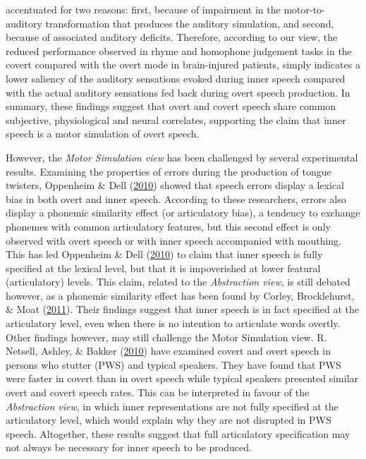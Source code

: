 \documentclass[a4paper,12pt,twoside,openright,oldfontcommands]{memoir}
\begin{document}
accentuated for two reasons: first, because of impairment in the
motor-to-auditory transformation that produces the auditory simulation,
and second, because of associated auditory deficits. Therefore,
according to our view, the reduced performance observed in rhyme and
homophone judgement tasks in the covert compared with the overt mode in
brain-injured patients, simply indicates a lower saliency of the
auditory sensations evoked during inner speech compared with the actual
auditory sensations fed back during overt speech production. In summary,
these findings suggest that overt and covert speech share common
subjective, physiological and neural correlates, supporting the claim
that inner speech is a motor simulation of overt speech.

However, the \emph{Motor Simulation view} has been challenged by several
experimental results. Examining the properties of errors during the
production of tongue twisters, Oppenheim \& Dell
(\protect\hyperlink{ref-oppenheim_motor_2010}{2010}) showed that speech
errors display a lexical bias in both overt and inner speech. According
to these researchers, errors also display a phonemic similarity effect
(or articulatory bias), a tendency to exchange phonemes with common
articulatory features, but this second effect is only observed with
overt speech or with inner speech accompanied with mouthing. This has
led Oppenheim \& Dell
(\protect\hyperlink{ref-oppenheim_motor_2010}{2010}) to claim that inner
speech is fully specified at the lexical level, but that it is
impoverished at lower featural (articulatory) levels. This claim,
related to the \emph{Abstraction view}, is still debated however, as a
phonemic similarity effect has been found by Corley, Brocklehurst, \&
Moat (\protect\hyperlink{ref-corley_error_2011}{2011}). Their findings
suggest that inner speech is in fact specified at the articulatory
level, even when there is no intention to articulate words overtly.
Other findings however, may still challenge the Motor Simulation view.
R. Netsell, Ashley, \& Bakker
(\protect\hyperlink{ref-netsell_inner_2010}{2010}) have examined covert
and overt speech in persons who stutter (PWS) and typical speakers. They
have found that PWS were faster in covert than in overt speech while
typical speakers presented similar overt and covert speech rates. This
can be interpreted in favour of the \emph{Abstraction view}, in which
inner representations are not fully specified at the articulatory level,
which would explain why they are not disrupted in PWS speech.
Altogether, these results suggest that full articulatory specification
may not always be necessary for inner speech to be produced.
\end{document}
